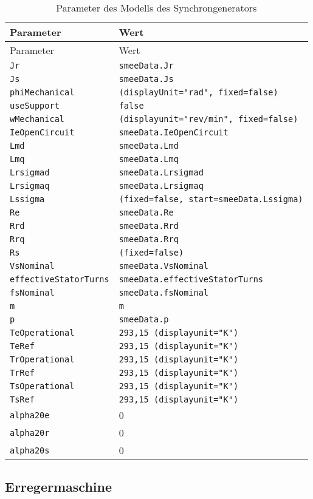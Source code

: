 \begin{longtable}[]{@{}ll@{}}
\caption{Parameter des Modells des Synchrongenerators}\label{tab:ParameterSG}
\tabularnewline
\toprule
Parameter & Wert\tabularnewline
\midrule
\endfirsthead
\toprule
Parameter & Wert\tabularnewline
\midrule
\endhead
\texttt{Jr} & \texttt{smeeData.Jr}\tabularnewline
\texttt{Js} & \texttt{smeeData.Js}\tabularnewline
\texttt{phiMechanical} &
\texttt{(displayUnit="rad",\ fixed=false)}\tabularnewline
\texttt{useSupport} & \texttt{false}\tabularnewline
\texttt{wMechanical} &
\texttt{(displayunit="rev/min",\ fixed=false)}\tabularnewline
\texttt{IeOpenCircuit} & \texttt{smeeData.IeOpenCircuit}\tabularnewline
\texttt{Lmd} & \texttt{smeeData.Lmd}\tabularnewline
\texttt{Lmq} & \texttt{smeeData.Lmq}\tabularnewline
\texttt{Lrsigmad} & \texttt{smeeData.Lrsigmad}\tabularnewline
\texttt{Lrsigmaq} & \texttt{smeeData.Lrsigmaq}\tabularnewline
\texttt{Lssigma} &
\texttt{(fixed=false,\ start=smeeData.Lssigma)}\tabularnewline
\texttt{Re} & \texttt{smeeData.Re}\tabularnewline
\texttt{Rrd} & \texttt{smeeData.Rrd}\tabularnewline
\texttt{Rrq} & \texttt{smeeData.Rrq}\tabularnewline
\texttt{Rs} & \texttt{(fixed=false)}\tabularnewline
\texttt{VsNominal} & \texttt{smeeData.VsNominal}\tabularnewline
\texttt{effectiveStatorTurns} &
\texttt{smeeData.effectiveStatorTurns}\tabularnewline
\texttt{fsNominal} & \texttt{smeeData.fsNominal}\tabularnewline
\texttt{m} & \texttt{m}\tabularnewline
\texttt{p} & \texttt{smeeData.p}\tabularnewline
\texttt{TeOperational} &
\texttt{293,15\ (displayunit="K")}\tabularnewline
\texttt{TeRef} & \texttt{293,15\ (displayunit="K")}\tabularnewline
\texttt{TrOperational} &
\texttt{293,15\ (displayunit="K")}\tabularnewline
\texttt{TrRef} & \texttt{293,15\ (displayunit="K")}\tabularnewline
\texttt{TsOperational} &
\texttt{293,15\ (displayunit="K")}\tabularnewline
\texttt{TsRef} & \texttt{293,15\ (displayunit="K")}\tabularnewline
\texttt{alpha20e} & 0\tabularnewline
\texttt{alpha20r} & 0\tabularnewline
\texttt{alpha20s} & 0\tabularnewline
\bottomrule
\end{longtable}

\subsection{Erregermaschine}\label{sec:Erregermaschine}

